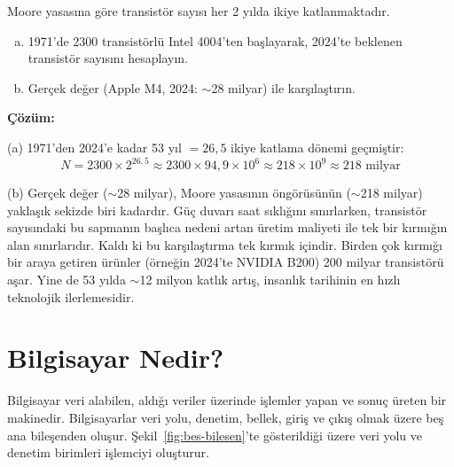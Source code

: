 \begin{ornek}[1.1]
\label{orn:moore-hesaplama}
Moore yasasına göre transistör sayısı her 2 yılda ikiye katlanmaktadır.
\begin{enumerate}[(a)]
\item 1971'de 2300 transistörlü Intel 4004'ten başlayarak, 2024'te beklenen transistör sayısını hesaplayın.
\item Gerçek değer (Apple M4, 2024: $\sim$28 milyar) ile karşılaştırın.
\end{enumerate}

\textbf{Çözüm:}

(a) 1971'den 2024'e kadar 53 yıl $= 26{,}5$ ikiye katlama dönemi geçmiştir:
\[
N = 2300 \times 2^{26{,}5} \approx 2300 \times 94{,}9 \times 10^{6} \approx 218 \times 10^{9} \approx 218 \text{ milyar}
\]

(b) Gerçek değer ($\sim$28 milyar), Moore yasasının öngörüsünün ($\sim$218 milyar) yaklaşık sekizde biri kadardır. Güç duvarı saat sıklığını sınırlarken, transistör sayısındaki bu sapmanın başlıca nedeni artan üretim maliyeti ile tek bir kırmığın alan sınırlarıdır. Kaldı ki bu karşılaştırma tek kırmık içindir. Birden çok kırmığı bir araya getiren ürünler (örneğin 2024'te NVIDIA B200) 200 milyar transistörü aşar. Yine de 53 yılda $\sim$12 milyon katlık artış, insanlık tarihinin en hızlı teknolojik ilerlemesidir.
\end{ornek}

\section{Bilgisayar Nedir?}
\label{sec:bilgisayar-nedir}

Bilgisayar veri alabilen, aldığı veriler üzerinde işlemler yapan ve sonuç üreten bir makinedir. Bilgisayarlar veri yolu, denetim, bellek, giriş ve çıkış olmak üzere beş ana bileşenden oluşur. Şekil~\ref{fig:bes-bilesen}'te gösterildiği üzere veri yolu ve denetim birimleri işlemciyi oluşturur.

